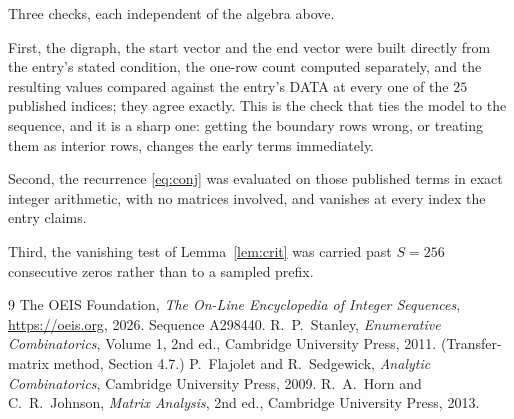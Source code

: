\documentclass[11pt,a4paper]{article}
\theoremstyle{plain}
\theoremstyle{definition}
\begin{document}
Three checks, each independent of the algebra above.

First, the digraph, the start vector and the end vector were built directly from the
entry's stated condition, the one-row count computed separately, and the resulting values
compared against the entry's DATA at every one of the $25$ published indices; they
agree exactly. This is the check that ties the model to the sequence, and it is a sharp one:
getting the boundary rows wrong, or treating them as interior rows, changes the early terms
immediately.

Second, the recurrence \eqref{eq:conj} was evaluated on those published terms in exact
integer arithmetic, with no matrices involved, and vanishes at every index the entry claims.

Third, the vanishing test of Lemma~\ref{lem:crit} was carried past $S=256$ consecutive
zeros rather than to a sampled prefix.

\begin{thebibliography}{9}
 The OEIS Foundation, \emph{The On-Line Encyclopedia of Integer
Sequences}, \url{https://oeis.org}, 2026. Sequence A298440.
 R.~P.~Stanley, \emph{Enumerative Combinatorics}, Volume 1, 2nd ed.,
Cambridge University Press, 2011. (Transfer-matrix method, Section 4.7.)
 P.~Flajolet and R.~Sedgewick, \emph{Analytic Combinatorics}, Cambridge
University Press, 2009.
 R.~A.~Horn and C.~R.~Johnson, \emph{Matrix Analysis}, 2nd ed., Cambridge
University Press, 2013.
\end{thebibliography}
\end{document}
